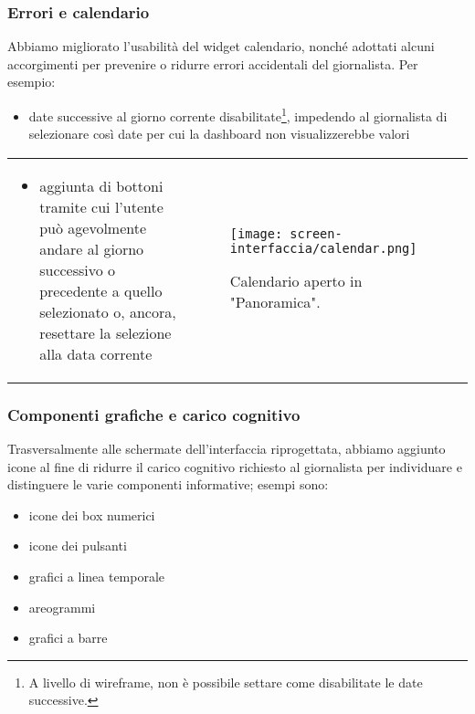 \begin{frame}
    \frametitle{Errori e calendario}
    \label{f:errori}
    Abbiamo migliorato l'usabilità del widget calendario, nonché adottati alcuni accorgimenti per prevenire o ridurre errori accidentali del giornalista. Per esempio:
    \begin{itemize}
        \item date successive al giorno corrente disabilitate\footnote{A livello di wireframe, non è possibile settare come disabilitate le date successive.}, impedendo al giornalista di selezionare così date per cui la dashboard non visualizzerebbe valori
    \end{itemize}
    \hspace{-8pt}
    \vspace{-10pt}
    \begin{tabular}{p{}p{}}    
        \begin{itemize}
            \item aggiunta di bottoni tramite cui l'utente può agevolmente andare al giorno successivo o precedente a quello selezionato o, ancora, resettare la selezione alla data corrente
        \end{itemize} &
            
        \begin{figure}
            \centering
            \vspace{-10pt}
            \texttt{[image: screen-interfaccia/calendar.png]}
            \caption{Calendario aperto in "Panoramica".} 
        \end{figure}  \\
    \end{tabular}   
    
\end{frame}

\begin{frame}
    \frametitle{Componenti grafiche e carico cognitivo}
    \label{f:grafica}
    Trasversalmente alle schermate dell'interfaccia riprogettata, abbiamo aggiunto icone al fine di ridurre il carico cognitivo richiesto al giornalista per individuare e distinguere le varie componenti informative; esempi sono:
    \begin{itemize}
        \item icone dei box numerici
        \item icone dei pulsanti
        \item grafici a linea temporale
        \item areogrammi
        \item grafici a barre
    \end{itemize}
\end{frame}

